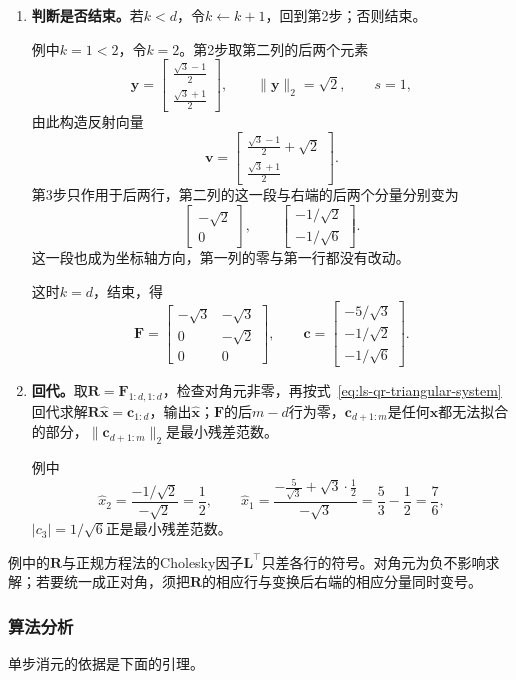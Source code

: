 \begin{enumerate}
 \item \textbf{判断是否结束。}若$k<d$，令$k\leftarrow k+1$，回到第2步；否则结束。

 例中$k=1<2$，令$k=2$。第2步取第二列的后两个元素
 \[
  \bm y=\begin{bmatrix}\frac{\sqrt3-1}2\\[2pt]\frac{\sqrt3+1}2\end{bmatrix},\qquad
  \lVert\bm y\rVert_2=\sqrt2,\qquad s=1,
 \]
 由此构造反射向量
 \[
  \bm v=\begin{bmatrix}\frac{\sqrt3-1}2+\sqrt2\\[2pt]\frac{\sqrt3+1}2\end{bmatrix}.
 \]
 第3步只作用于后两行，第二列的这一段与右端的后两个分量分别变为
 \[
  \begin{bmatrix}-\sqrt2\\0\end{bmatrix},\qquad
  \begin{bmatrix}-1/\sqrt2\\-1/\sqrt6\end{bmatrix}.
 \]
 这一段也成为坐标轴方向，第一列的零与第一行都没有改动。

 这时$k=d$，结束，得
 \[
  \bm F=\begin{bmatrix}-\sqrt3&-\sqrt3\\0&-\sqrt2\\0&0\end{bmatrix},\qquad
  \bm c=\begin{bmatrix}-5/\sqrt3\\-1/\sqrt2\\-1/\sqrt6\end{bmatrix}.
 \]

 \item \textbf{回代。}取$\bm R=\bm F_{1:d,1:d}$，检查对角元非零，再按式~\eqref{eq:ls-qr-triangular-system}回代求解$\bm R\hat{\bm x}=\bm c_{1:d}$，输出$\hat{\bm x}$；$\bm F$的后$m-d$行为零，$\bm c_{d+1:m}$是任何$\bm x$都无法拟合的部分，$\lVert\bm c_{d+1:m}\rVert_2$是最小残差范数。

 例中
 \[
  \hat x_2=\frac{-1/\sqrt2}{-\sqrt2}=\frac12,\qquad
  \hat x_1=\frac{-\frac5{\sqrt3}+\sqrt3\cdot\frac12}{-\sqrt3}=\frac53-\frac12=\frac76,
 \]
 $\lvert c_3\rvert=1/\sqrt6$正是最小残差范数。
\end{enumerate}

例中的$\bm R$与正规方程法的Cholesky因子$\bm L^\top$只差各行的符号。对角元为负不影响求解；若要统一成正对角，须把$\bm R$的相应行与变换后右端的相应分量同时变号。

\subsubsection{算法分析}
单步消元的依据是下面的引理。

